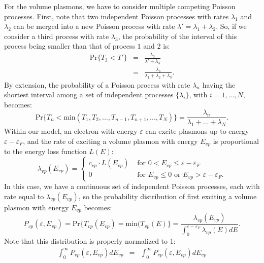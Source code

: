 \begin{refsection}
For the volume plasmons, we have to consider multiple competing Poisson processes. 
First, note that two independent Poisson processes with rates $\lambda_1$ and 
$\lambda_2$ can be merged into a new Poisson process with rate $\lambda' = \lambda_1 
+ \lambda_2$. So, if we consider a third process with rate $\lambda_3$, the probability 
of the interval of this process being smaller than that of process $1$ and $2$ is:
\begin{eqnarray} 
\text{Pr}\{T_3 < T'\} &=& \frac{\lambda_3 }{\lambda' + \lambda_3} \nonumber \\
                      &=& \frac{\lambda_3 }{\lambda_1  + \lambda_2 + \lambda_3}.
\end{eqnarray} 
By extension, the probability of a Poisson process with rate $\lambda_n$ having 
the shortest interval among a set of independent processes $\{\lambda_i\}$, with 
$i = 1, ..., N$, becomes:
\begin{equation}
\text{Pr}\{T_n < \text{min}(T_1, T_2, ..., T_{n-1}, T_{n+1}, ..., T_N)\} = \frac{\lambda_n}{\lambda_1  + ... + \lambda_N}.
\end{equation}
Within our model, an electron with energy $\varepsilon$ can excite plasmons up to 
energy $\varepsilon - \varepsilon_F$, and the rate of exciting a volume plasmon with 
energy $E_{vp}$ is proportional to the energy loss function $L(E)$:
\begin{equation} 
\lambda_{vp}(E_{vp}) = 
\begin{cases} 
c_{vp} \cdot L(E_{vp}) &\text{  for } 0 < E_{vp} \leq \varepsilon - \varepsilon_F \\
0 &\text{  for } E_{vp} \leq 0 \text{ or } E_{vp} > \varepsilon - \varepsilon_F.
\end{cases}
\end{equation} 
In this case, we have a continuous set of independent Poisson processes, each with 
rate equal to $\lambda_{vp}(E_{vp})$, so the probability distribution of first
exciting a volume plasmon with energy $E_{vp}$ becomes:
\begin{equation}
P_{vp}(\varepsilon, E_{vp}) = \text{Pr}\{T_{vp}(E_{vp}) = \text{min}(T_{vp}(E)\} = \frac{\lambda_{vp}(E_{vp})}{\int_0^{\varepsilon - \varepsilon_F} \lambda_{vp}(E) dE}.
\end{equation}
Note that this distribution is properly normalized to 1:
\begin{eqnarray*}
\int_0^\infty P_{vp}(\varepsilon, E_{vp}) dE_{vp} &=& \int_0^\infty P_{vp}(\varepsilon, E_{vp}) dE_{vp}  \\

\end{eqnarray*}
\end{refsection}

